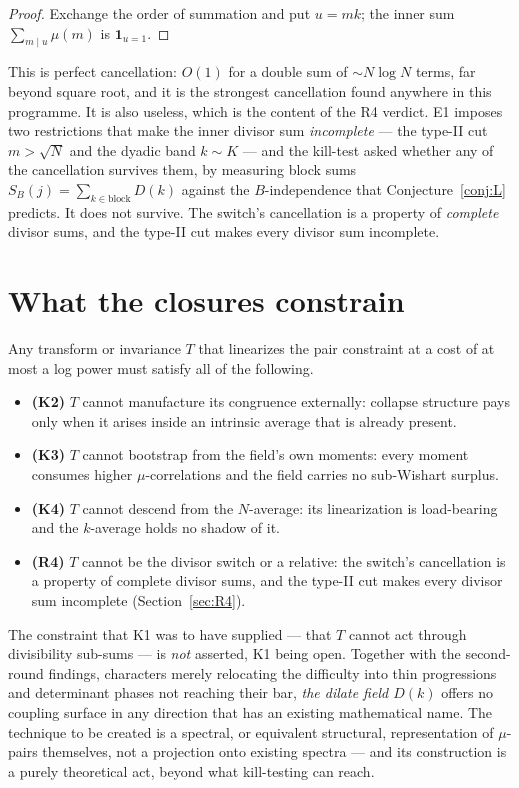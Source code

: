 \documentclass[11pt,a4paper]{article}
\theoremstyle{plain}
\theoremstyle{definition}
\theoremstyle{remark}
\begin{document}
\begin{proof}
Exchange the order of summation and put $u=mk$; the inner sum
$\sum_{m\mid u}\mu(m)$ is $\mathbf 1_{u=1}$.
\end{proof}

This is perfect cancellation: $O(1)$ for a double sum of
$\sim N\log N$ terms, far beyond square root, and it is the strongest
cancellation found anywhere in this programme. It is also useless,
which is the content of the R4 verdict. E1 imposes two restrictions
that make the inner divisor sum \emph{incomplete} --- the type-II cut
$m>\sqrt N$ and the dyadic band $k\sim K$ --- and the kill-test asked
whether any of the cancellation survives them, by measuring block sums
$S_B(j)=\sum_{k\in\text{block}}D(k)$ against the $B$-independence that
Conjecture~\ref{conj:L} predicts. It does not survive. The switch's
cancellation is a property of \emph{complete} divisor sums, and the
type-II cut makes every divisor sum incomplete.

\section{What the closures constrain}

Any transform or invariance $T$ that linearizes the pair constraint at
a cost of at most a log power must satisfy all of the following.

\begin{itemize}
\item \textbf{(K2)} $T$ cannot manufacture its congruence externally:
collapse structure pays only when it arises inside an intrinsic
average that is already present.
\item \textbf{(K3)} $T$ cannot bootstrap from the field's own moments:
every moment consumes higher $\mu$-correlations and the field carries
no sub-Wishart surplus.
\item \textbf{(K4)} $T$ cannot descend from the $N$-average: its
linearization is load-bearing and the $k$-average holds no shadow of
it.
\item \textbf{(R4)} $T$ cannot be the divisor switch or a relative:
the switch's cancellation is a property of complete divisor sums, and
the type-II cut makes every divisor sum incomplete
(Section~\ref{sec:R4}).
\end{itemize}

The constraint that K1 was to have supplied --- that $T$ cannot act
through divisibility sub-sums --- is \emph{not} asserted, K1 being
open. Together with the second-round findings, characters merely
relocating the difficulty into thin progressions and determinant
phases not reaching their bar, \emph{the dilate field $D(k)$} offers no
coupling surface in any direction that has an existing mathematical
name. The technique to be created is a spectral, or equivalent
structural, representation of $\mu$-pairs themselves, not a projection
onto existing spectra --- and its construction is a purely theoretical
act, beyond what kill-testing can reach.
\end{document}
